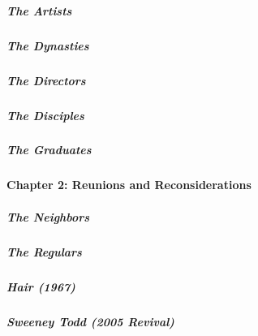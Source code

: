 \href{/interactive/2020/04/13/t-magazine/black-art-galleries.html}{}

\hypertarget{the-artists}{%
\subparagraph{The Artists}\label{the-artists}}

\href{/interactive/2020/04/13/t-magazine/italian-fashion-design-houses.html}{}

\hypertarget{the-dynasties}{%
\subparagraph{The Dynasties}\label{the-dynasties}}

\href{/interactive/2020/04/13/t-magazine/gordon-parks.html}{}

\hypertarget{the-directors}{%
\subparagraph{The Directors}\label{the-directors}}

\href{/interactive/2020/04/13/t-magazine/enrique-olvera-chef.html}{}

\hypertarget{the-disciples}{%
\subparagraph{The Disciples}\label{the-disciples}}

\href{/interactive/2020/04/13/t-magazine/royal-academy-antwerp.html}{}

\hypertarget{the-graduates}{%
\subparagraph{The Graduates}\label{the-graduates}}

\hypertarget{chapter-2-reunions-and-reconsiderations}{%
\paragraph{Chapter 2: Reunions and
Reconsiderations}\label{chapter-2-reunions-and-reconsiderations}}

\href{/interactive/2020/04/13/t-magazine/ninth-street-greenwich-village-neighbors.html}{}

\hypertarget{the-neighbors}{%
\subparagraph{The Neighbors}\label{the-neighbors}}

\href{/interactive/2020/04/13/t-magazine/omen-restaurant-nyc.html}{}

\hypertarget{the-regulars}{%
\subparagraph{The Regulars}\label{the-regulars}}

\href{/interactive/2020/04/13/t-magazine/hair-musical-broadway.html}{}

\hypertarget{hair-1967}{%
\subparagraph{Hair (1967)}\label{hair-1967}}

\href{/interactive/2020/04/13/t-magazine/sweeney-todd-revival.html}{}

\hypertarget{sweeney-todd-2005-revival}{%
\subparagraph{Sweeney Todd (2005
Revival)}\label{sweeney-todd-2005-revival}}

\href{/interactive/2020/04/13/t-magazine/daughters-of-the-dust.html}{}


